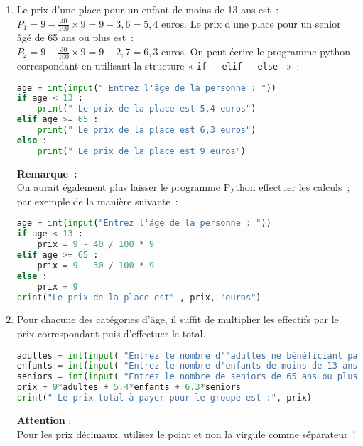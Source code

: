 \begin{corrige}
     \begin{enumerate}
          \item
          Le prix d'une place pour un enfant de moins de 13 ans est~:\\
          $ P_{ 1}=9 - \frac{ 40}{ 100 }  \times 9=9 - 3,6=5,4 $ euros.
          \newpar
          Le prix d'une place pour un senior âgé de 65 ans ou plus est~:\\
          $ P_{ 2}=9 - \frac{ 30}{ 100 }  \times 9=9 - 2,7=6,3 $ euros.
          \newpar
          On peut écrire le programme python correspondant en utilisant la structure « \texttt{if - elif - else}~  »~:
\begin{lstlisting}[language=Python]
age = int(input(" Entrez l'âge de la personne : "))
if age < 13 :
    print(" Le prix de la place est 5,4 euros")
elif age >= 65 :
    print(" Le prix de la place est 6,3 euros")
else : 
    print(" Le prix de la place est 9 euros")
          \end{lstlisting}
          \newpar
          \textbf{Remarque~:}\\
          On aurait également plus laisser le programme Python effectuer les calculs~; par exemple de la manière suivante~:
\begin{lstlisting}[language=Python]
age = int(input("Entrez l'âge de la personne : "))
if age < 13 :
    prix = 9 - 40 / 100 * 9
elif age >= 65 :
    prix = 9 - 30 / 100 * 9
else :
    prix = 9
print("Le prix de la place est" , prix, "euros")
     \end{lstlisting}
     \item
     Pour chacune des catégories d'âge, il suffit de multiplier les effectifs par le prix correspondant puis d'effectuer le total.
\begin{lstlisting}[language=Python]
adultes = int(input( "Entrez le nombre d''adultes ne bénéficiant pas de réduction : "))
enfants = int(input( "Entrez le nombre d'enfants de moins de 13 ans : "))
seniors = int(input( "Entrez le nombre de seniors de 65 ans ou plus : "))
prix = 9*adultes + 5.4*enfants + 6.3*seniors
print(" Le prix total à payer pour le groupe est :", prix)
\end{lstlisting}
\textbf{Attention} :\\
Pour les prix décimaux, utilisez le point et non la virgule comme séparateur~!
\end{enumerate}
\end{corrige}
